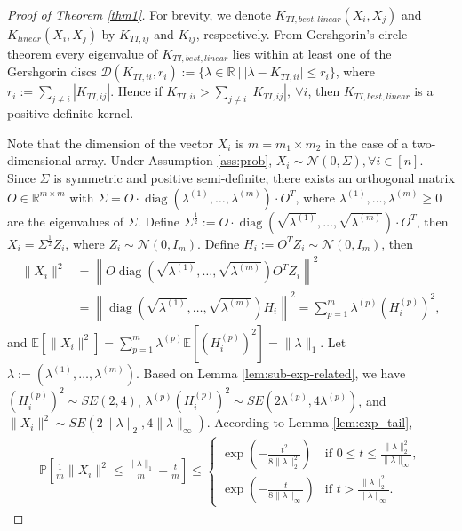 \documentclass{article}
\theoremstyle{plain}
\theoremstyle{definition}
\theoremstyle{remark}
\begin{document}
\begin{proof}[Proof of Theorem \ref{thm1}]
For brevity, we denote $K_{TI,best,linear}(X_i, X_j)$ and $K_{linear}(X_i, X_j)$ by $K_{TI,ij}$ and $K_{ij}$, respectively. 
From Gershgorin's circle theorem \cite{varga2010gervsgorin} every eigenvalue of $K_{TI,best,linear}$ lies within at least one of the Gershgorin discs $\mathcal{D}(K_{TI,ii}, r_i) := \{\lambda \in \mathbb{R} \ | \ |\lambda - K_{TI,ii}| \le r_i\}$, where $r_i := \sum_{j \ne i} |K_{TI,ij}|$. Hence if $K_{TI,ii} > \sum_{j \ne i} |K_{TI,ij}|, \ \forall i$, then $K_{TI,best,linear}$ is a positive definite kernel.

Note that the dimension of the vector $X_i$ is $m = m_1 \times m_2$ in the case of a two-dimensional array. Under Assumption \ref{ass:prob}, $X_i \sim \mathcal{N}(0, \Sigma), \forall i \in [n]$. Since $\Sigma$ is symmetric and positive semi-definite, there exists an orthogonal matrix $O \in \mathbb{R}^{m \times m}$ with $\Sigma = O \cdot \operatorname{diag}\left(\lambda^{(1)}, \ldots, \lambda^{(m)}\right) \cdot O^{T}$, where $\lambda^{(1)}, \ldots, \lambda^{(m)} \geq 0$ are the eigenvalues of $\Sigma$. Define $\Sigma^{\frac{1}{2}} := O \cdot \operatorname{diag}\left(\sqrt{\lambda^{(1)}}, \ldots, \sqrt{\lambda^{(m)}}\right) \cdot O^{T}$, then $X_i = \Sigma^{\frac{1}{2}} Z_i$, where $Z_i \sim \mathcal{N}(0, I_{m})$. Define $H_i := O^T Z_i \sim \mathcal{N}(0, I_m)$, then
\begin{align*}
    \|X_i\|^{2} &= \left\|O \operatorname{diag}\left(\sqrt{\lambda^{(1)}}, \ldots, \sqrt{\lambda^{(m)}}\right) O^{T} Z_i\right\|^{2} \\
    &= \left\|\operatorname{diag}\left(\sqrt{\lambda^{(1)}}, \ldots, \sqrt{\lambda^{(m)}}\right) H_i\right\|^{2} = \sum_{p=1}^{m} \lambda^{(p)} (H_i^{(p)})^{2},
\end{align*}
and $\mathbb{E}[\|X_i\|^2] = \sum_{p=1}^{m} \lambda^{(p)} \mathbb{E}[(H_i^{(p)})^{2}] = \|\lambda\|_1$. Let $\lambda := (\lambda^{(1)}, \dots, \lambda^{(m)})$. Based on Lemma \ref{lem:sub-exp-related}, we have $(H_i^{(p)})^2 \sim SE(2, 4)$, $\lambda^{(p)} (H_i^{(p)})^2 \sim SE(2\lambda^{(p)}, 4\lambda^{(p)})$, and $\|X_i\|^2 \sim SE(2\|\lambda\|_2, 4\|\lambda\|_{\infty})$. According to Lemma \ref{lem:exp_tail},
\begin{align*}
    \mathbb{P}\left[\frac{1}{m} \|X_i\|^2 \le \frac{\|\lambda\|_1}{m} - \frac{t}{m}\right] \le
    \begin{cases}
    \exp(-\frac{t^2}{8 \|\lambda\|_2^2}) & \text{if } 0 \le t \le \frac{\|\lambda\|_2^2}{ \|\lambda\|_{\infty}},\\
    \exp(-\frac{t}{8 \|\lambda\|_{\infty}}) & \text{if } t > \frac{\|\lambda\|_2^2}{ \|\lambda\|_{\infty}}.
    \end{cases}
\end{align*}


\end{proof}
\end{document}

